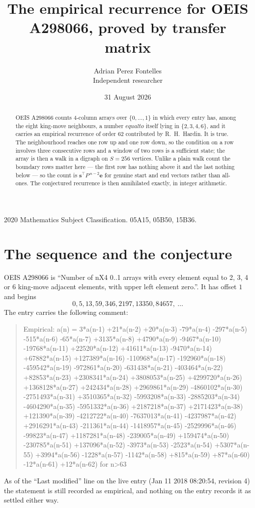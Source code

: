 \documentclass[11pt,a4paper]{article}
\title{The empirical recurrence for OEIS A298066, proved by transfer matrix}
\author{Adrian Perez Fontelles\\ \small Independent researcher}
\date{31 August 2026}
\theoremstyle{plain}
\theoremstyle{definition}
\begin{document}
\maketitle

\begin{abstract}
OEIS A298066 counts $4$-column arrays over $\{0,\dots,1\}$ in which every entry has,
among the eight king-move neighbours, a number $equal to$ itself lying in $\{2,3,4,6\}$, and it carries an empirical
recurrence of order $62$ contributed by R.~H.~Hardin. It is true. The neighbourhood
reaches one row up and one row down, so the condition on a row involves three consecutive
rows and a window of two rows is a sufficient state; the array is then a walk in a digraph
on $S=256$ vertices. Unlike a plain walk count the boundary rows matter here --- the first
row has nothing above it and the last nothing below --- so the count is
$\mathbf{s}^{\!\top}P^{\,n-2}\mathbf{e}$ for genuine start and end vectors rather than
all-ones. The conjectured recurrence is then annihilated exactly, in integer arithmetic.
\end{abstract}

\noindent\small 2020 Mathematics Subject Classification. 05A15, 05B50, 15B36.\normalsize

\section{The sequence and the conjecture}

OEIS A298066 is ``Number of nX4 0..1 arrays with every element equal to 2, 3, 4 or 6 king-move adjacent elements, with upper left element zero.''. It has offset
$1$ and begins
\[
0, 5, 13, 59, 346, 2197, 13350, 84657,\ \dots
\]
The entry carries the following comment:
\begin{quote}\small
Empirical: a(n) = 3*a(n-1) +21*a(n-2) +20*a(n-3) -79*a(n-4) -297*a(n-5) -515*a(n-6) -65*a(n-7) +3135*a(n-8) +4790*a(n-9) -9467*a(n-10) -19768*a(n-11) +22520*a(n-12) +41611*a(n-13) -9470*a(n-14) +67882*a(n-15) +127389*a(n-16) -110968*a(n-17) -192960*a(n-18) -459542*a(n-19) -972861*a(n-20) -631438*a(n-21) -403464*a(n-22) +82853*a(n-23) +2308341*a(n-24) +3808053*a(n-25) +4299720*a(n-26) +1368128*a(n-27) +242434*a(n-28) +2969861*a(n-29) -4860102*a(n-30) -2751493*a(n-31) +3510365*a(n-32) -5993208*a(n-33) -2885203*a(n-34) -4604290*a(n-35) -5951332*a(n-36) +2187218*a(n-37) +2171423*a(n-38) +121390*a(n-39) -4212722*a(n-40) -7637013*a(n-41) -4237987*a(n-42) +2916291*a(n-43) -211361*a(n-44) -1418957*a(n-45) -2529996*a(n-46) -99823*a(n-47) +1187281*a(n-48) -239005*a(n-49) +159474*a(n-50) -230785*a(n-51) +137096*a(n-52) -3973*a(n-53) -2523*a(n-54) +5307*a(n-55) +3994*a(n-56) -1228*a(n-57) -1142*a(n-58) +815*a(n-59) +87*a(n-60) -12*a(n-61) +12*a(n-62) for n>63
\end{quote}
As of the ``Last modified'' line on the live entry (Jan 11 2018 08:20:54, revision
4) the statement is still recorded as empirical, and nothing on the entry
records it as settled either way.
\end{document}
